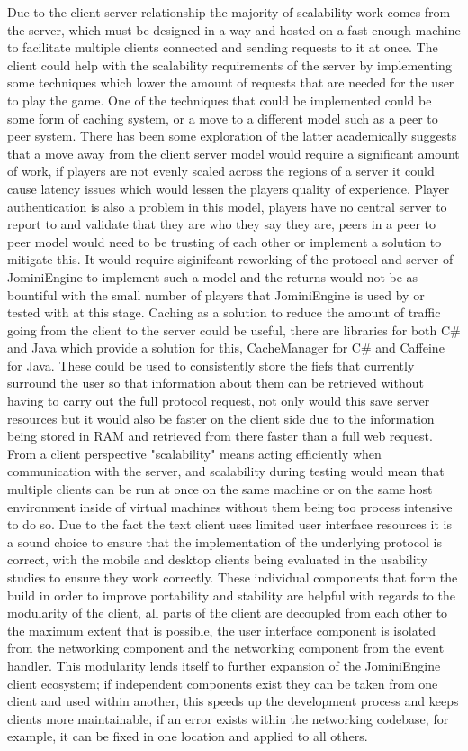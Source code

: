 \documentclass{article}
\begin{document}
Due to the client server relationship the majority of scalability work comes from the server, which must be designed in a way and hosted on a fast enough machine to facilitate multiple clients connected and sending requests to it at once. The client could help with the scalability requirements of the server by implementing some techniques which lower the amount of requests that are needed for the user to play the game. One of the techniques that could be implemented could be some form of caching system, or a move to a different model such as a peer to peer system. There has been some exploration of the latter academically\cite{1354485} suggests that a move away from the client server model would require a significant amount of work, if players are not evenly scaled across the regions of a server it could cause latency issues which would lessen the players quality of experience. Player authentication is also a problem in this model, players have no central server to report to and validate that they are who they say they are, peers in a peer to peer model would need to be trusting of each other or implement a solution to mitigate this. It would require siginifcant reworking of the protocol and server of JominiEngine to implement such a model and the returns would not be as bountiful with the small number of players that JominiEngine is used by or tested with at this stage. Caching as a solution to reduce the amount of traffic going from the client to the server could be useful, there are libraries for both C\# and Java which provide a solution for this, CacheManager\cite{CacheManager} for C\# and Caffeine\cite{Caffeine} for Java. These could be used to consistently store the fiefs that currently surround the user so that information about them can be retrieved without having to carry out the full protocol request, not only would this save server resources but it would also be faster on the client side due to the information being stored in RAM and retrieved from there faster than a full web request. From a client perspective "scalability" means acting efficiently when communication with the server, and scalability during testing would mean that multiple clients can be run at once on the same machine or on the same host environment inside of virtual machines without them being too process intensive to do so. Due to the fact the text client uses limited user interface resources it is a sound choice to ensure that the implementation of the underlying protocol is correct, with the mobile and desktop clients being evaluated in the usability studies to ensure they work correctly. These individual components that form the build in order to improve portability and stability are helpful with regards to the modularity of the client, all parts of the client are decoupled from each other to the maximum extent that is possible, the user interface component is isolated from the networking component and the networking component from the event handler. This modularity lends itself to further expansion of the JominiEngine client ecosystem; if independent components exist they can be taken from one client and used within another, this speeds up the development process and keeps clients more maintainable, if an error exists within the networking codebase, for example, it can be fixed in one location and applied to all others.
\end{document}
